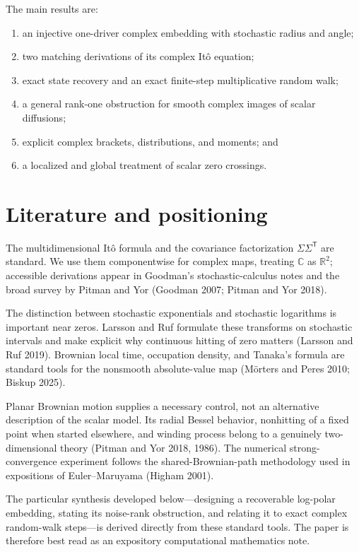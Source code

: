 \documentclass[
  english,
  10pt,
  letterpaper,
  DIV=11,
  numbers=noendperiod]{scrartcl}
\providecommand{\tightlist}{%
  \setlength{\itemsep}{0pt}\setlength{\parskip}{0pt}}
\theoremstyle{plain}
\theoremstyle{remark}
\begin{document}
The main results are:

\begin{enumerate}
\def\labelenumi{\arabic{enumi}.}
\tightlist
\item
  an injective one-driver complex embedding with stochastic radius and
  angle;
\item
  two matching derivations of its complex Itô equation;
\item
  exact state recovery and an exact finite-step multiplicative random
  walk;
\item
  a general rank-one obstruction for smooth complex images of scalar
  diffusions;
\item
  explicit complex brackets, distributions, and moments; and
\item
  a localized and global treatment of scalar zero crossings.
\end{enumerate}

\section{Literature and positioning}\label{sec-literature}

The multidimensional Itô formula and the covariance factorization
\(\Sigma\Sigma^\mathsf T\) are standard. We use them componentwise for
complex maps, treating \(\mathbb C\) as \(\mathbb R^2\); accessible
derivations appear in Goodman's stochastic-calculus notes and the broad
survey by Pitman and Yor (Goodman 2007; Pitman and Yor 2018).

The distinction between stochastic exponentials and stochastic
logarithms is important near zeros. Larsson and Ruf formulate these
transforms on stochastic intervals and make explicit why continuous
hitting of zero matters (Larsson and Ruf 2019). Brownian local time,
occupation density, and Tanaka's formula are standard tools for the
nonsmooth absolute-value map (Mörters and Peres 2010; Biskup 2025).

Planar Brownian motion supplies a necessary control, not an alternative
description of the scalar model. Its radial Bessel behavior, nonhitting
of a fixed point when started elsewhere, and winding process belong to a
genuinely two-dimensional theory (Pitman and Yor 2018, 1986). The
numerical strong-convergence experiment follows the shared-Brownian-path
methodology used in expositions of Euler--Maruyama (Higham 2001).

The particular synthesis developed below---designing a recoverable
log-polar embedding, stating its noise-rank obstruction, and relating it
to exact complex random-walk steps---is derived directly from these
standard tools. The paper is therefore best read as an expository
computational mathematics note.
\end{document}

